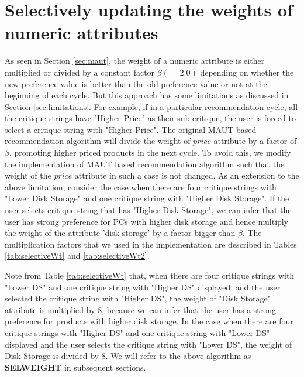 \section{Selectively updating the weights of numeric attributes}
\label{sec:sel}
As seen in Section \ref{sec:maut}, the weight of a numeric attribute is either multiplied or divided by a constant factor $\beta (=2.0)$ depending on whether the new preference value is better than the old preference value or not at the beginning of each cycle.
But this approach has some limitations as discussed in Section \ref{sec:limitations}.
For example, if in a particular recommendation cycle, all the critique strings have "Higher Price" as their sub-critique, the user is forced to select a critique string with "Higher Price".
The original MAUT based recommendation algorithm will divide the weight of $price$ attribute by a factor of $\beta$, promoting higher priced products in the next cycle.
To avoid this, we modify the implementation of MAUT based recommendation algorithm such that the weight of the $price$ attribute in such a case is not changed.
As an extension to the above limitation, consider the case when there are four critique strings with "Lower Disk Storage" and one critique string with "Higher Disk Storage". 
If the user selects critique string that has "Higher Disk Storage", we can infer that the user has strong preference for PCs with higher disk storage and hence multiply the weight of the attribute 'disk storage' by a factor bigger than $\beta$.
The multiplication factors that we used in the implementation are described in Tables \ref{tab:selectiveWt} and \ref{tab:selectiveWt2}.

Note from Table \ref{tab:selectiveWt} that, when there are four critique strings with "Lower DS" and one critique string with "Higher DS" displayed, and the user selected the critique string with "Higher DS", 
the weight of "Disk Storage" attribute is multiplied by 8, because we can infer that the user has a strong preference for products with higher disk storage.
In the case when there are four critique strings with "Higher DS" and one critique string with "Lower DS" displayed and the user selects the critique string with "Lower DS", the weight of Disk Storage is divided by 8. 
We will refer to the above algorithm as \textbf{SELWEIGHT} in subsequent sections.


